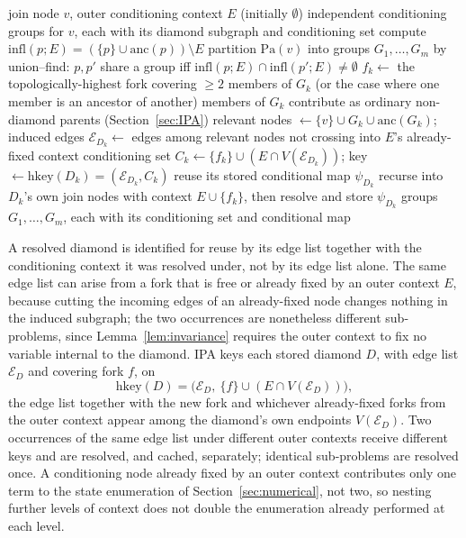 \documentclass[preprint,12pt]{elsarticle}
\begin{document}
\begin{algorithm}[h]
\caption{Diamond identification at a join node (recursive, factorised)}
\label{alg:identify}
\begin{algorithmic}[1]
\REQUIRE join node $v$, outer conditioning context $E$ (initially $\emptyset$)
\ENSURE independent conditioning groups for $v$, each with its diamond subgraph and conditioning set
    \STATE compute $\text{infl}(p;E) = (\{p\}\cup\text{anc}(p))\setminus E$ 
\ENDFOR
\STATE partition $\text{Pa}(v)$ into groups $G_1,\ldots,G_m$ by union--find: $p,p'$ share a group iff $\text{infl}(p;E)\cap\text{infl}(p';E)\neq\emptyset$ 
    \STATE $f_k \gets$ the topologically-highest fork covering $\geq2$ members of $G_k$ (or the case where one member is an ancestor of another)
        \STATE members of $G_k$ contribute as ordinary non-diamond parents (Section~\ref{sec:IPA})
    \ELSE
        \STATE relevant nodes $\gets \{v\}\cup G_k\cup\text{anc}(G_k)$; induced edges $\mathcal{E}_{D_k} \gets$ edges among relevant nodes not crossing into $E$'s already-fixed context
        \STATE conditioning set $C_k \gets \{f_k\}\cup(E\cap V(\mathcal{E}_{D_k}))$; key $\gets \mathrm{hkey}(D_k)=(\mathcal{E}_{D_k},C_k)$ 
            \STATE reuse its stored conditional map $\psi_{D_k}$
        \ELSE
            \STATE recurse into $D_k$'s own join nodes with context $E\cup\{f_k\}$, then resolve and store $\psi_{D_k}$
        \ENDIF
    \ENDIF
\ENDFOR
\RETURN groups $G_1,\ldots,G_m$, each with its conditioning set and conditional map
\end{algorithmic}
\end{algorithm}

A resolved diamond is identified for reuse by its edge list together with the conditioning context it was resolved under, not by its edge list alone. The same edge list can arise from a fork that is free or already fixed by an outer context $E$, because cutting the incoming edges of an already-fixed node changes nothing in the induced subgraph; the two occurrences are nonetheless different sub-problems, since Lemma~\ref{lem:invariance} requires the outer context to fix no variable internal to the diamond. IPA keys each stored diamond $D$, with edge list $\mathcal{E}_D$ and covering fork $f$, on
\begin{equation}
\mathrm{hkey}(D) = \bigl(\mathcal{E}_D,\ \{f\}\cup(E\cap V(\mathcal{E}_D))\bigr),
\label{eq:hkey}
\end{equation}
the edge list together with the new fork and whichever already-fixed forks from the outer context appear among the diamond's own endpoints $V(\mathcal{E}_D)$. Two occurrences of the same edge list under different outer contexts receive different keys and are resolved, and cached, separately; identical sub-problems are resolved once. A conditioning node already fixed by an outer context contributes only one term to the state enumeration of Section~\ref{sec:numerical}, not two, so nesting further levels of context does not double the enumeration already performed at each level.
\end{document}
